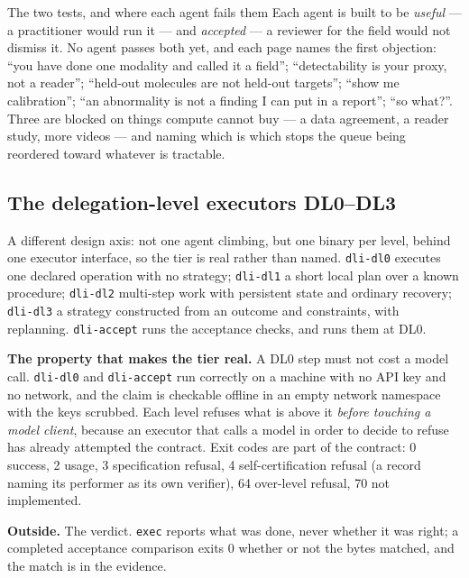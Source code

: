 \documentclass[11pt]{article}
\theoremstyle{definition}
\begin{document}
\begin{claimbox}{The two tests, and where each agent fails them}
Each agent is built to be \emph{useful} --- a practitioner would run it --- and \emph{accepted} --- a reviewer for the field would not dismiss it. No agent passes both yet, and each page names the first objection: ``you have done one modality and called it a field''; ``detectability is your proxy, not a reader''; ``held-out molecules are not held-out targets''; ``show me calibration''; ``an abnormality is not a finding I can put in a report''; ``so what?''. Three are blocked on things compute cannot buy --- a data agreement, a reader study, more videos --- and naming which is which stops the queue being reordered toward whatever is tractable.
\end{claimbox}

\subsection{The delegation-level executors DL0--DL3}\label{sec:dl}

A different design axis: not one agent climbing, but one binary per level, behind one executor interface, so the tier is real rather than named. \texttt{dli-dl0} executes one declared operation with no strategy; \texttt{dli-dl1} a short local plan over a known procedure; \texttt{dli-dl2} multi-step work with persistent state and ordinary recovery; \texttt{dli-dl3} a strategy constructed from an outcome and constraints, with replanning. \texttt{dli-accept} runs the acceptance checks, and runs them at DL0.

\textbf{The property that makes the tier real.} A DL0 step must not cost a model call. \texttt{dli-dl0} and \texttt{dli-accept} run correctly on a machine with no API key and no network, and the claim is checkable offline in an empty network namespace with the keys scrubbed. Each level refuses what is above it \emph{before touching a model client}, because an executor that calls a model in order to decide to refuse has already attempted the contract. Exit codes are part of the contract: 0 success, 2 usage, 3 specification refusal, 4 self-certification refusal (a record naming its performer as its own verifier), 64 over-level refusal, 70 not implemented.

\textbf{Outside.} The verdict. \texttt{exec} reports what was done, never whether it was right; a completed acceptance comparison exits 0 whether or not the bytes matched, and the match is in the evidence.
\end{document}
